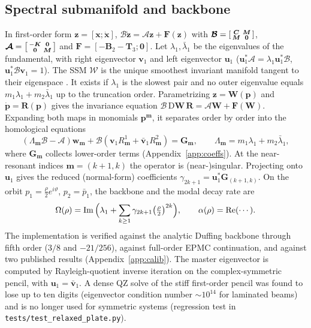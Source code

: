 \subsection{Spectral submanifold and backbone}\label{sec:ssm}
In first-order form $\bm z=[\bm x;\dot{\bm x}]$,
$\bm{\mathcal B}\dot{\bm z}=\bm{\mathcal A}\bm z+\bm F(\bm z)$ with
$\bm{\mathcal B}=\begin{bsmallmatrix}\bm C&\bm M\\\bm M&\bm0\end{bsmallmatrix}$,
$\bm{\mathcal A}=\begin{bsmallmatrix}-\bm K&\bm0\\\bm0&\bm M\end{bsmallmatrix}$ and
$\bm F=[-\bm B_2-\bm T_3;\bm0]$. Let $\lambda_1,\bar\lambda_1$ be the eigenvalues of the
fundamental, with right eigenvector $\bm v_1$ and left eigenvector $\bm u_1$
($\bm u_1^*\bm{\mathcal A}=\lambda_1\bm u_1^*\bm{\mathcal B}$,
$\bm u_1^*\bm{\mathcal B}\bm v_1=1$). The SSM $\mathcal W$ is the unique smoothest
invariant manifold tangent to their eigenspace \cite{haller2016}. It exists if
$\lambda_1$ is the slowest pair and no outer eigenvalue equals
$m_1\lambda_1+m_2\bar\lambda_1$ up to the truncation order. Parametrizing
$\bm z=\bm W(\bm p)$ and $\dot{\bm p}=\bm R(\bm p)$ gives the invariance equation
$\bm{\mathcal B}\,\mathrm D\bm W\,\bm R=\bm{\mathcal A}\bm W+\bm F(\bm W)$. Expanding both
maps in monomials $\bm p^{\bm m}$, it separates order by order into the homological
equations
\begin{equation}
(\Lambda_{\bm m}\bm{\mathcal B}-\bm{\mathcal A})\bm w_{\bm m}
+\bm{\mathcal B}(\bm v_1R^1_{\bm m}+\bar{\bm v}_1R^2_{\bm m})=\bm G_{\bm m},
\qquad \Lambda_{\bm m}=m_1\lambda_1+m_2\bar\lambda_1,
\label{eq:homological}
\end{equation}
where $\bm G_{\bm m}$ collects lower-order terms (Appendix~\ref{app:coeffs}). At the
near-resonant indices $\bm m=(k{+}1,k)$ the operator is (near-)singular. Projecting onto
$\bm u_1$ gives the reduced (normal-form) coefficients
$\gamma_{2k+1}=\bm u_1^*\bm G_{(k+1,k)}$. On the orbit
$p_1=\tfrac\rho2e^{i\vartheta}$, $p_2=\bar p_1$, the backbone and the modal decay rate are
\begin{equation}
\Omega(\rho)=\operatorname{Im}\Big(\lambda_1+\sum_{k\ge1}\gamma_{2k+1}\big(\tfrac{\rho}{2}\big)^{2k}\Big),\qquad
\alpha(\rho)=\operatorname{Re}(\cdots).
\label{eq:backbone}
\end{equation}
The implementation is verified against the analytic Duffing backbone through fifth
order ($3/8$ and $-21/256$), against full-order EPMC continuation, and against two
published results \cite{pozzi2025} (Appendix~\ref{app:calib}). The master
eigenvector is computed by Rayleigh-quotient inverse iteration on the complex-symmetric
pencil, with $\bm u_1=\bar{\bm v}_1$. A dense QZ solve of the stiff first-order pencil was
found to lose up to ten digits (eigenvector condition number $\sim10^{14}$ for laminated
beams) and is no longer used for symmetric systems (regression test in
\texttt{tests/test\_relaxed\_plate.py}).

